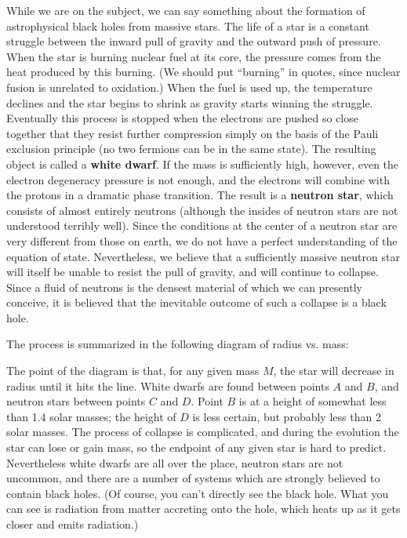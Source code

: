 While we are on the subject, we can say something about the formation
of astrophysical black holes from massive stars.  The life of a star
is a constant struggle between the inward pull of gravity and the
outward push of pressure.  When the star is burning nuclear fuel at
its core, the pressure comes from the heat produced by this burning.
(We should put ``burning'' in quotes, since nuclear fusion is unrelated
to oxidation.)  When the fuel is used up, the temperature declines and
the star begins to shrink as gravity starts winning the struggle.
Eventually this process is stopped when the electrons are pushed so
close together that they resist further compression simply on the
basis of the Pauli exclusion principle (no two fermions can be in the
same state).  The resulting object is called a {\bf white dwarf}.
If the mass is sufficiently high, however, even the electron 
degeneracy pressure is not enough, and the electrons will combine
with the protons in a dramatic phase transition.  The result is a
{\bf neutron star}, which consists of almost entirely neutrons (although
the insides of neutron stars are not understood terribly well).
Since the conditions at the center of a neutron star are very different
from those on earth, we do not have a perfect understanding of the
equation of state.  Nevertheless, we believe that a
sufficiently massive neutron star will itself be unable to resist the
pull of gravity, and will continue to collapse.  Since a fluid of
neutrons is the densest material of which we can presently conceive,
it is believed that the inevitable outcome of such a collapse is
a black hole.

The process is summarized in the following diagram of radius vs.
mass:

\begin{figure}[h]
  \centerline{
  }
\end{figure}

\noindent The point of the diagram is that, for any given mass $M$,
the star will decrease in radius until it hits the line.  White
dwarfs are found between points $A$ and $B$, and neutron stars 
between points $C$ and $D$.  Point $B$ is at a height of somewhat less
than 1.4 solar masses; the height of $D$ is less certain, but probably
less than 2 solar masses.  The process of collapse is complicated, and
during the evolution the star can lose or gain mass, so the endpoint
of any given star is hard to predict.  Nevertheless white dwarfs are
all over the place, neutron stars are not uncommon, and there are a
number of systems which are strongly believed to contain black holes.
(Of course, you can't directly see the black hole.  What you can see
is radiation from matter accreting onto the hole, which heats up as
it gets closer and emits radiation.)

